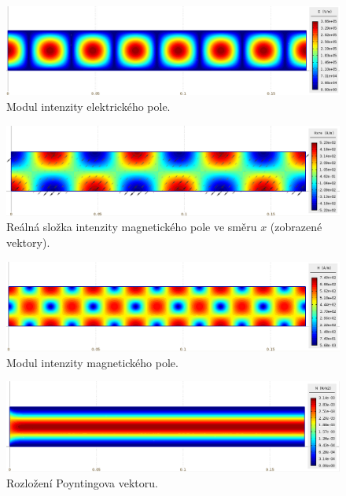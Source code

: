 \begin{figure}[!h]
	\centering
	\includegraphics[width=15cm]{priklad_R100_E.png}
	\caption{Modul intenzity elektrického pole.}
	\label{obr:priklad_R100_E}
\end{figure}
\begin{figure}[!h]
	\centering
	\includegraphics[width=15cm]{priklad_R100_Hre.png}
	\caption{Reálná složka intenzity magnetického pole ve směru $x$ (zobrazené vektory).}
	\label{obr:priklad_R100_Hre}
\end{figure}
\begin{figure}[!h]
	\centering
	\includegraphics[width=15cm]{priklad_R100_H.png}
	\caption{Modul intenzity magnetického pole.}
	\label{obr:priklad_R100_H}
\end{figure}
\begin{figure}[!h]
	\centering
	\includegraphics[width=15cm]{priklad_R100_N.png}
	\caption{Rozložení Poyntingova vektoru.}
	\label{obr:priklad_R100_N}
\end{figure}


